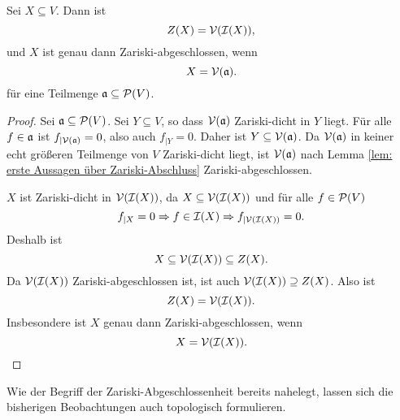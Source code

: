 \documentclass[a4paper,10pt]{article}
\begin{document}
\begin{lem}\label{lem: Charakterisierung durch Verschwindungsmengen}
 Sei $X \subseteq V$. Dann ist
 \[
  Z(X) = \mathcal{V}( \mathcal{I}(X) ),
 \]
 und  $X$ ist genau dann Zariski-abgeschlossen, wenn
 \[
  X = \mathcal{V}(\mathfrak{a}).
 \]
 für eine Teilmenge $\mathfrak{a} \subseteq \mathcal{P}(V)$.
\end{lem}
\begin{proof}
 Sei $\mathfrak{a} \subseteq \mathcal{P}(V)$. Sei $Y \subseteq V$, so dass $\mathcal{V}(\mathfrak{a})$ Zariski-dicht in $Y$ liegt. Für alle $f \in \mathfrak{a}$ ist $f_{|\mathcal{V}(\mathfrak{a})} = 0$, also auch $f_{|Y} = 0$. Daher ist $Y \subseteq \mathcal{V}(\mathfrak{a})$. Da $\mathcal{V}(\mathfrak{a})$ in keiner echt größeren Teilmenge von $V$ Zariski-dicht liegt, ist $\mathcal{V}(\mathfrak{a})$ nach Lemma \ref{lem: erste Aussagen über Zariski-Abschluss} Zariski-abgeschlossen.
 
 $X$ ist Zariski-dicht in $\mathcal{V}(\mathcal{I}(X))$, da $X \subseteq \mathcal{V}(\mathcal{I}(X))$ und für alle $f \in \mathcal{P}(V)$
 \[
  f_{|X} = 0 \Rightarrow f \in \mathcal{I}(X) \Rightarrow f_{|\mathcal{V}(\mathcal{I}(X))} = 0.
 \]
 Deshalb ist
 \[
  X \subseteq \mathcal{V}(\mathcal{I}(X)) \subseteq Z(X).
 \]
 Da $\mathcal{V}(\mathcal{I}(X))$ Zariski-abgeschlossen ist, ist auch $\mathcal{V}(\mathcal{I}(X)) \supseteq Z(X)$. Also ist
 \[
  Z(X) = \mathcal{V}(\mathcal{I}(X)).
 \]
 Insbesondere ist $X$ genau dann Zariski-abgeschlossen, wenn
 \[
  X = \mathcal{V}(\mathcal{I}(X)).
 \]
\end{proof}


Wie der Begriff der Zariski-Abgeschlossenheit bereits nahelegt, lassen sich die bisherigen Beobachtungen auch topologisch formulieren. 
\end{document}
